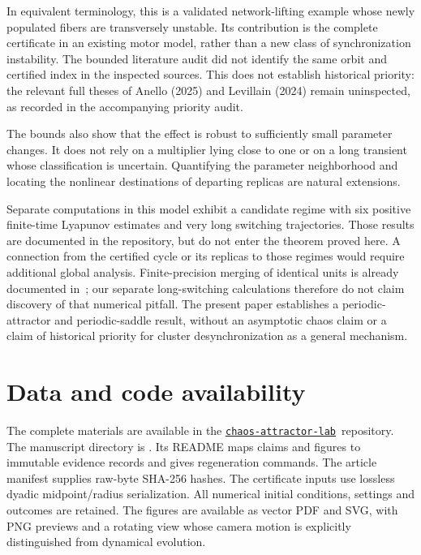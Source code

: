 \documentclass[11pt]{article}
\newcommand{\repo}{\href{https://github.com/Griboedow/chaos-attractor-lab}{\texttt{chaos-attractor-lab}}}
\begin{document}
In equivalent terminology, this is a validated network-lifting example
whose newly populated fibers are transversely unstable. Its contribution
is the complete certificate in an existing motor model, rather than a
new class of synchronization instability. The bounded literature audit
did not identify the same orbit and certified index in the inspected
sources. This does not establish historical priority: the relevant full
theses of Anello (2025) and Levillain (2024) remain uninspected, as recorded
in the accompanying priority audit.

The bounds also show that the effect is robust to sufficiently small
parameter changes. It does not rely on a multiplier lying close to one
or on a long transient whose classification is uncertain. Quantifying
the parameter neighborhood and locating the nonlinear destinations of
departing replicas are natural extensions.

Separate computations in this model exhibit a candidate regime with six
positive finite-time Lyapunov estimates and very long switching
trajectories. Those results are documented in the repository, but do not
enter the theorem proved here. A connection from the certified cycle or
its replicas to those regimes would require additional global analysis.
Finite-precision merging of identical units is already documented
in~\cite[Methods]{zaks}; our separate long-switching calculations therefore
do not claim discovery of that numerical pitfall.
The present paper establishes a periodic-attractor and periodic-saddle
result, without an asymptotic chaos claim or a claim of historical
priority for cluster desynchronization as a general mechanism.

\section*{Data and code availability}
The complete materials are available in the \repo\ repository.
The manuscript directory is .
Its README maps claims and figures
to immutable evidence records and gives regeneration commands. The
article manifest supplies raw-byte SHA-256 hashes. The certificate inputs
use lossless dyadic midpoint/radius serialization. All numerical initial
conditions, settings and outcomes are retained. The figures are available
as vector PDF and SVG, with PNG previews and a rotating view whose camera
motion is explicitly distinguished from dynamical evolution.

\appendix
\end{document}
